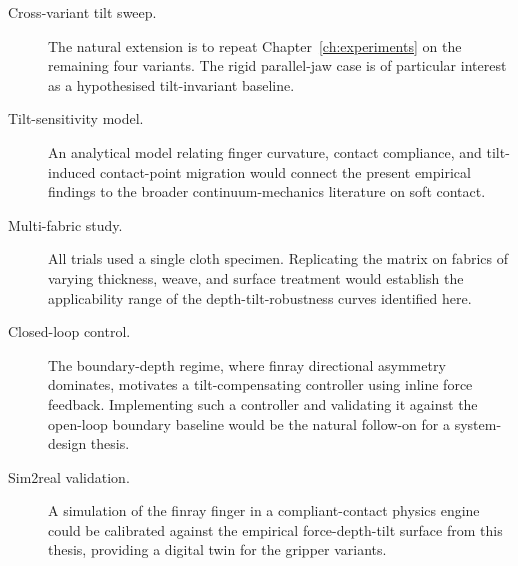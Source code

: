 \begin{description}
  \item[Cross-variant tilt sweep.] The natural extension is to repeat
        Chapter~\ref{ch:experiments} on the remaining four variants. The rigid
        parallel-jaw case is of particular interest as a hypothesised
        tilt-invariant baseline.
  \item[Tilt-sensitivity model.] An analytical model relating finger
        curvature, contact compliance, and tilt-induced contact-point
        migration would connect the present empirical findings to the
        broader continuum-mechanics literature on soft contact.
  \item[Multi-fabric study.] All trials used a single cloth specimen.
        Replicating the matrix on fabrics of varying thickness, weave,
        and surface treatment would establish the applicability range
        of the depth-tilt-robustness curves identified here.
  \item[Closed-loop control.] The boundary-depth regime, where finray
        directional asymmetry dominates, motivates a tilt-compensating
        controller using inline force feedback. Implementing such a
        controller and validating it against the open-loop boundary
        baseline would be the natural follow-on for a system-design
        thesis.
  \item[Sim2real validation.] A simulation of the finray finger in a
        compliant-contact physics engine could be calibrated against the
        empirical force-depth-tilt surface from this thesis, providing
        a digital twin for the gripper variants.
\end{description}
